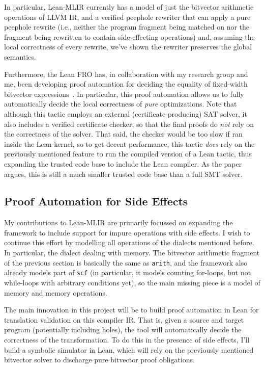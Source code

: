 \documentclass[a4paper]{scrartcl}
\begin{document}
In particular, Lean-MLIR currently has a model of just the bitvector
arithmetic operations of LLVM IR, and a verified peephole rewriter that
can apply a pure peephole rewrite (i.e., neither the program fragment
being matched on nor the fragment being rewritten to contain
side-effecting operations) and, assuming the local correctness of every
rewrite, we've shown the rewriter preserves the global semantics.

Furthermore, the Lean FRO has, in collaboration with my research group
and me, been developing proof automation for deciding the equality
of fixed-width bitvector expressions~\cite{bovingTamingBitvectorBestiary}. In
particular, this proof automation allows us to fully automatically
decide the local correctness of \emph{pure} optimizations. Note that
although this tactic employs an external (certificate-producing) SAT
solver, it also includes a verified certificate checker, so that the
final proofs do \emph{not} rely on the correctness of the solver. That
said, the checker would be too slow if ran inside the Lean kernel, so to
get decent performance, this tactic \emph{does} rely on the previously
mentioned feature to run the compiled version of a Lean tactic, thus expanding
the trusted code base to include the Lean compiler.
As the paper argues, this is still a much smaller trusted code base than a full
SMT solver.

\subsection{Proof Automation for Side
Effects}\label{proof-automation-for-side-effects}

My contributions to Lean-MLIR are primarily focussed on expanding the framework to 
include support for impure operations with side effects. 
I wish to continue this effort by modelling all operations of the
dialects mentioned before. In particular, the dialect dealing with memory.
The bitvector arithmetic fragment of the previous section is basically the same as \texttt{arith}, and the
framework also already models part of \texttt{scf} (in particular, it
models counting for-loops, but not while-loops with arbitrary conditions
yet), so the main missing piece is a model of memory and memory
operations.

The main innovation in this project will be to build proof automation in
Lean for translation validation on this compiler IR. That is, given a
source and target program (potentially including holes), the tool will
automatically decide the correctness of the transformation. To do this
in the presence of side effects, I'll build a symbolic simulator in Lean, 
which will rely on the previously mentioned bitvector solver to discharge pure
bitvector proof obligations.
\end{document}
